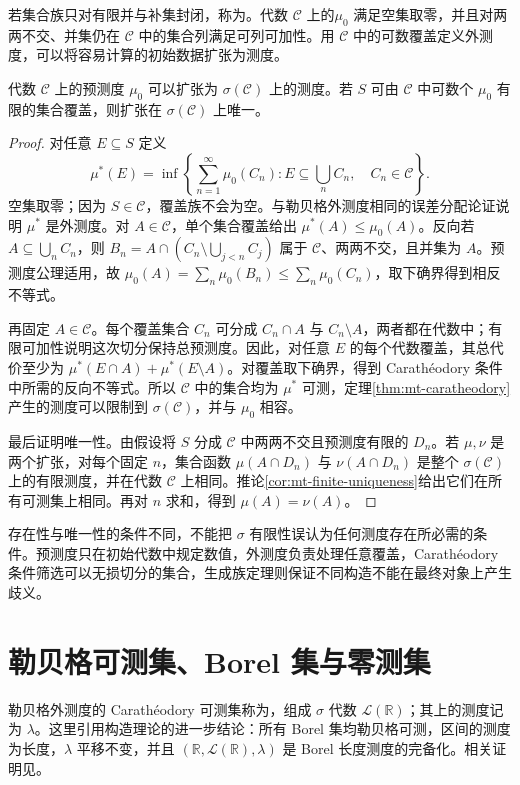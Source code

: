 \documentclass[UTF8,12pt,a4paper,fontset=fandol]{ctexbook}
\begin{document}
若集合族只对有限并与补集封闭，称为。代数 $\mathcal C$ 上的$\mu_0$ 满足空集取零，并且对两两不交、并集仍在 $\mathcal C$ 中的集合列满足可列可加性。用 $\mathcal C$ 中的可数覆盖定义外测度，可以将容易计算的初始数据扩张为测度。

\begin{theorem}[预测度扩张]
代数 $\mathcal C$ 上的预测度 $\mu_0$ 可以扩张为 $\sigma(\mathcal C)$ 上的测度。若 $S$ 可由 $\mathcal C$ 中可数个 $\mu_0$ 有限的集合覆盖，则扩张在 $\sigma(\mathcal C)$ 上唯一。
\label{thm:mt-extension}
\end{theorem}
\begin{proof}
对任意 $E\subseteq S$ 定义
\[
 \mu^*(E)=\inf\left\{\sum_{n=1}^{\infty}\mu_0(C_n):
 E\subseteq\bigcup_nC_n,\quad C_n\in\mathcal C\right\}.
\]
空集取零；因为 $S\in\mathcal C$，覆盖族不会为空。与勒贝格外测度相同的误差分配论证说明 $\mu^*$ 是外测度。对 $A\in\mathcal C$，单个集合覆盖给出 $\mu^*(A)\leq\mu_0(A)$。反向若 $A\subseteq\bigcup_nC_n$，则
$B_n=A\cap(C_n\setminus\bigcup_{j<n}C_j)$
属于 $\mathcal C$、两两不交，且并集为 $A$。预测度公理适用，故
$\mu_0(A)=\sum_n\mu_0(B_n)\leq\sum_n\mu_0(C_n)$，取下确界得到相反不等式。

再固定 $A\in\mathcal C$。每个覆盖集合 $C_n$ 可分成 $C_n\cap A$ 与 $C_n\setminus A$，两者都在代数中；有限可加性说明这次切分保持总预测度。因此，对任意 $E$ 的每个代数覆盖，其总代价至少为 $\mu^*(E\cap A)+\mu^*(E\setminus A)$。对覆盖取下确界，得到 Carathéodory 条件中所需的反向不等式。所以 $\mathcal C$ 中的集合均为 $\mu^*$ 可测，定理\ref{thm:mt-caratheodory}产生的测度可以限制到 $\sigma(\mathcal C)$，并与 $\mu_0$ 相容。

最后证明唯一性。由假设将 $S$ 分成 $\mathcal C$ 中两两不交且预测度有限的 $D_n$。若 $\mu,\nu$ 是两个扩张，对每个固定 $n$，集合函数 $\mu(A\cap D_n)$ 与 $\nu(A\cap D_n)$ 是整个 $\sigma(\mathcal C)$ 上的有限测度，并在代数 $\mathcal C$ 上相同。推论\ref{cor:mt-finite-uniqueness}给出它们在所有可测集上相同。再对 $n$ 求和，得到 $\mu(A)=\nu(A)$。
\end{proof}
存在性与唯一性的条件不同，不能把 $\sigma$ 有限性误认为任何测度存在所必需的条件。预测度只在初始代数中规定数值，外测度负责处理任意覆盖，Carathéodory 条件筛选可以无损切分的集合，生成族定理则保证不同构造不能在最终对象上产生歧义。

\section{勒贝格可测集、Borel 集与零测集}
勒贝格外测度的 Carathéodory 可测集称为，组成 $\sigma$ 代数 $\mathcal L(\mathbb R)$；其上的测度记为 $\lambda$。这里引用构造理论的进一步结论：所有 Borel 集均勒贝格可测，区间的测度为长度，$\lambda$ 平移不变，并且 $(\mathbb R,\mathcal L(\mathbb R),\lambda)$ 是 Borel 长度测度的完备化。相关证明见\cite[第1章]{teschl-ra}。
\end{document}
